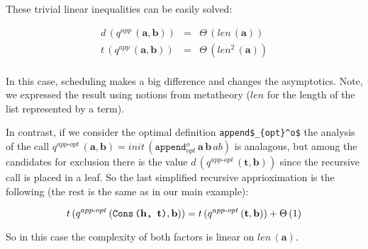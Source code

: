 These trivial linear inequalities can be easily solved:

\[
\begin{array}{lcl}
d\,(q^{app}\,(\mathbf{a}, \mathbf{b})) & = & \Theta\,(len\,(\mathbf{a})) \\
t\,(q^{app}\,(\mathbf{a}, \mathbf{b})) & = & \Theta\,(len^2\,(\mathbf{a})) \\
\end{array}
 \]
 
In this case, scheduling makes a big difference and changes the asymptotics. Note, we expressed the result using notions from metatheory
($len$ for the length of the list represented by a term).

In contrast, if we consider the optimal definition \lstinline|append$_{opt}^o$| the analysis of the call
$q^{app\text{-}opt}\,(\mathbf{a}, \mathbf{b}) = init\,(\texttt{append$_{opt}^o$} \, \mathbf{a} \, \mathbf{b} \, ab)$ is analagous,
but among the candidates for exclusion there is the value $d\,(q^{app\text{-}opt}\,(\mathbf{t}, \mathbf{b}))$ since the recursive
call is placed in a leaf. So the last simplified recursive apprioximation is the following (the rest is
the same as in our main example):

\[t\,(q^{app\text{-}opt}\,(\texttt{Cons\,($\mathbf{h}$, $\mathbf{t}$)}, \mathbf{b})) = t\,(q^{app\text{-}opt}\,(\mathbf{t}, \mathbf{b})) + \Theta\,(1) \]

So in this case the complexity of both factors is linear on $len\,(\mathbf{a})$.

